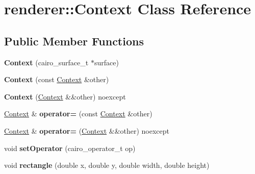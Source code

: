\hypertarget{classrenderer_1_1Context}{}\section{renderer\+::Context Class Reference}
\label{classrenderer_1_1Context}
\subsection*{Public Member Functions}
\begin{DoxyCompactItemize}
\item 
\mbox{\label{classrenderer_1_1Context_aa59983e364e31a89277673bea61c5033}} 
{\bfseries Context} (cairo\+\_\+surface\+\_\+t $\ast$surface)
\item 
\mbox{\label{classrenderer_1_1Context_a19b84f4ee37f0563999f112145ee95d9}} 
{\bfseries Context} (const \mbox{\hyperlink{classrenderer_1_1Context}{Context}} \&other)
\item 
\mbox{\label{classrenderer_1_1Context_a3a6974b89ee8c92653ffd95bdbcb1711}} 
{\bfseries Context} (\mbox{\hyperlink{classrenderer_1_1Context}{Context}} \&\&other) noexcept
\item 
\mbox{\label{classrenderer_1_1Context_a6fbc94136ea5c74c9655dc50cbbffdd2}} 
\mbox{\hyperlink{classrenderer_1_1Context}{Context}} \& {\bfseries operator=} (const \mbox{\hyperlink{classrenderer_1_1Context}{Context}} \&other)
\item 
\mbox{\label{classrenderer_1_1Context_abe262fdbb0cdc6264ce15ce7669ab46f}} 
\mbox{\hyperlink{classrenderer_1_1Context}{Context}} \& {\bfseries operator=} (\mbox{\hyperlink{classrenderer_1_1Context}{Context}} \&\&other) noexcept
\item 
\mbox{\label{classrenderer_1_1Context_adb7617dc39c0c1d5850ccc2612888ad9}} 
void {\bfseries set\+Operator} (cairo\+\_\+operator\+\_\+t op)
\item 
\mbox{\label{classrenderer_1_1Context_a302adacb9bd2eee6d3adbbb1b3fbb3f5}} 
void {\bfseries rectangle} (double x, double y, double width, double height)

\end{DoxyCompactItemize}
